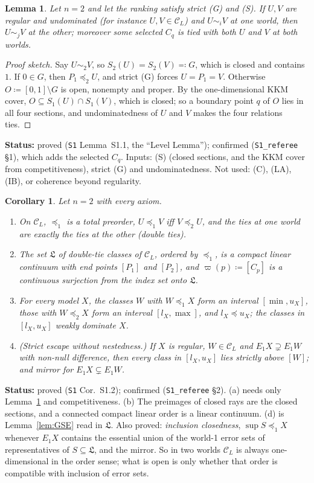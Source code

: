 \documentclass[11pt]{article}
\newtheorem{lemma}[theorem]{Lemma}
\newtheorem{corollary}[theorem]{Corollary}
\theoremstyle{definition}
\theoremstyle{remark}
\newcommand{\C}{\mathcal C}
\newcommand{\src}[1]{\texttt{#1}}
\newcommand{\status}[1]{\par\smallskip\noindent\textbf{Status:} #1\par\smallskip}
\begin{document}
\begin{lemma}\label{lem:level}
Let $n=2$ and let the ranking satisfy strict (G) and (S). If $U,V$ are regular and undominated (for instance $U,V\in\C_L$) and $U\sim_iV$ at one world, then $U\sim_jV$ at the other; moreover some selected $C_q$ is tied with both $U$ and $V$ at both worlds.
\end{lemma}
\begin{proof}[Proof sketch]
Say $U\sim_2V$, so $S_2(U)=S_2(V)\eqqcolon G$, which is closed and contains $1$. If $0\in G$, then $P_1\preceq_2U$, and strict (G) forces $U=P_1=V$. Otherwise $O\coloneqq[0,1]\setminus G$ is open, nonempty and proper. By the one-dimensional KKM cover, $O\subseteq S_1(U)\cap S_1(V)$, which is closed; so a boundary point $q$ of $O$ lies in all four sections, and undominatedness of $U$ and $V$ makes the four relations ties.
\end{proof}
\status{proved (\src{S1} Lemma~S1.1, the ``Level Lemma''); confirmed (\src{S1\_referee} \S1), which adds the selected $C_q$. Inputs: (S) (closed sections, and the KKM cover from competitiveness), strict (G) and undominatedness. Not used: (C), (LA), (IB), or coherence beyond regularity.}

\begin{corollary}\label{cor:continuum}
Let $n=2$ with every axiom.
\begin{enumerate}[leftmargin=*,label=(\alph*)]
\item On $\C_L$, $\preceq_1$ is a total preorder, $U\preceq_1V$ iff $V\preceq_2U$, and the ties at one world are exactly the ties at the other (\emph{double ties}).
\item The set $\mathfrak L$ of double-tie classes of $\C_L$, ordered by $\preceq_1$, is a compact linear continuum with end points $[P_1]$ and $[P_2]$, and $\varpi(p)\coloneqq[C_p]$ is a continuous surjection from the index set onto $\mathfrak L$.
\item For every model $X$, the classes $W$ with $W\preceq_1X$ form an interval $[\min,u_X]$, those with $W\preceq_2X$ form an interval $[l_X,\max]$, and $l_X\preceq u_X$; the classes in $[l_X,u_X]$ weakly dominate $X$.
\item (Strict escape without nestedness.) If $X$ is regular, $W\in\C_L$ and $E_1X\supsetneq E_1W$ with non-null difference, then every class in $[l_X,u_X]$ lies strictly above $[W]$; and mirror for $E_1X\subsetneq E_1W$.
\end{enumerate}
\end{corollary}
\status{proved (\src{S1} Cor.~S1.2); confirmed (\src{S1\_referee} \S2). (a) needs only Lemma~\ref{lem:level} and competitiveness. (b) The preimages of closed rays are the closed sections, and a connected compact linear order is a linear continuum. (d) is Lemma~\ref{lem:GSE} read in $\mathfrak L$. Also proved: \emph{inclusion closedness}, $\sup S\preceq_1X$ whenever $E_1X$ contains the essential union of the world-1 error sets of representatives of $S\subseteq\mathfrak L$, and the mirror. So in two worlds $\C_L$ is always one-dimensional in the order sense; what is open is only whether that order is compatible with inclusion of error sets.}
\end{document}
